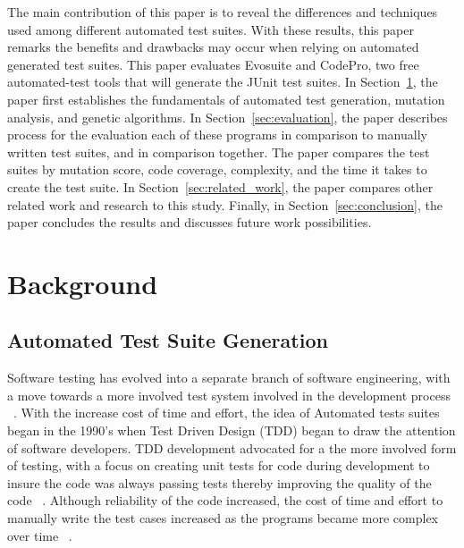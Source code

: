 \documentclass[conference]{IEEEtran}
\begin{document}
The main contribution of this paper is to reveal the differences and techniques used among different automated test suites. With these results, this paper remarks the benefits and drawbacks may occur when relying on automated generated test suites. This paper evaluates Evosuite and CodePro, two free automated-test tools that will generate the JUnit test suites. In Section~\ref{sec:background}, the paper first establishes the fundamentals of automated test generation, mutation analysis, and genetic algorithms. In Section~\ref{sec:evaluation}, the paper describes process for the evaluation each of these programs in comparison to manually written test suites, and in comparison together. The paper compares the test suites by mutation score, code coverage, complexity, and the time it takes to create the test suite. In Section~\ref{sec:related_work}, the paper compares other related work and research to this study. Finally, in Section~\ref{sec:conclusion}, the paper concludes the results and discusses future work possibilities.

\section{Background}
\label{sec:background}

\subsection{Automated Test Suite Generation}
Software testing has evolved into a separate branch of software engineering, with a move towards a more involved test system involved in the development process ~\cite{Gelperin:1988:GST:62959.62965}. With the increase cost of time and effort, the idea of Automated tests suites began in the 1990's when Test Driven Design (TDD) began to draw the attention of software developers. TDD development advocated for a the more involved form of testing, with a focus on creating unit tests for code during development to insure the code was always passing tests thereby improving the quality of the code ~\cite{Canfora:2006:EAT:1159733.1159788}.  Although reliability of the code increased, the cost of time and effort to manually write the test cases increased as the programs became more complex over time ~\cite{clarke1998automated}. 
\end{document}
